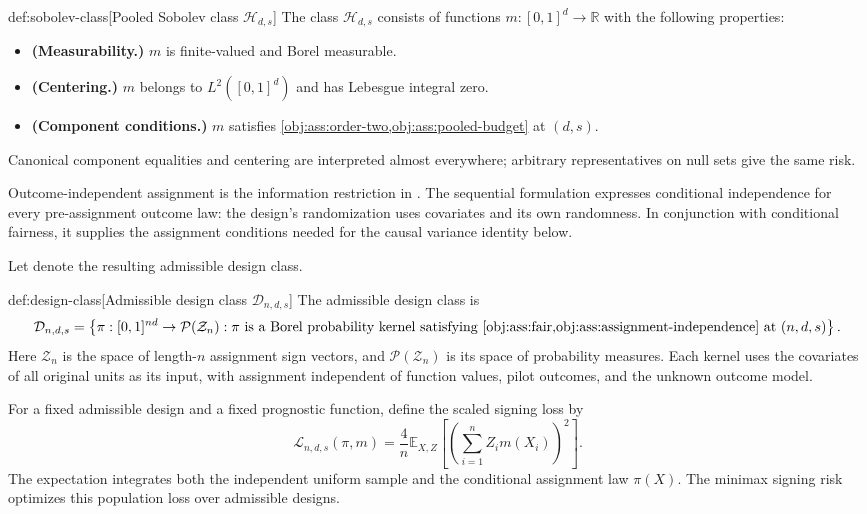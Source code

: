 \documentclass[11pt]{article}
\begin{document}
\begin{definitionv}{def:sobolev-class}[Pooled Sobolev class \(\mathcal H_{d,s}\)]
The class \(\mathcal H_{d,s}\) consists of functions \(m:[0,1]^d\to\mathbb R\) with the following properties:
\begin{itemize}
\item \textbf{(Measurability.)} \(m\) is finite-valued and Borel measurable.
\item \textbf{(Centering.)} \(m\) belongs to \(L^2([0,1]^d)\) and has Lebesgue integral zero.
\item \textbf{(Component conditions.)} \(m\) satisfies \cref{obj:ass:order-two,obj:ass:pooled-budget} at \((d,s)\).
\end{itemize}
Canonical component equalities and centering are interpreted almost everywhere; arbitrary representatives on null sets give the same risk.
\end{definitionv}

Outcome-independent assignment is the information restriction in \citep[Definition 2.2]{Cytrynbaum2026Limits}. The sequential formulation expresses conditional independence for every pre-assignment outcome law: the design's randomization uses covariates and its own randomness. In conjunction with conditional fairness, it supplies the assignment conditions needed for the causal variance identity below.

Let  denote the resulting admissible design class.

\begin{definitionv}{def:design-class}[Admissible design class $\mathcal D_{n,d,s}$]
The admissible design class is
\[
\mathcal D_{n,d,s}
=
\left\{
\pi:[0,1]^{nd}\to\mathcal P(\mathcal Z_n):
\pi \text{ is a Borel probability kernel satisfying }
\cref{obj:ass:fair,obj:ass:assignment-independence}
\text{ at }(n,d,s)
\right\}.
\]
Here \(\mathcal Z_n\) is the space of length-\(n\) assignment sign vectors, and \(\mathcal P(\mathcal Z_n)\) is its space of probability measures. Each kernel uses the covariates of all original units as its input, with assignment independent of function values, pilot outcomes, and the unknown outcome model.
\end{definitionv}

For a fixed admissible design and a fixed prognostic function, define the scaled signing loss  by
\[
\mathcal L_{n,d,s}(\pi,m)
=
\frac4n
\mathbb E_{X,Z}
\left[
\left(\sum_{i=1}^n Z_i m(X_i)\right)^2
\right].
\]
The expectation integrates both the independent uniform sample and the conditional assignment law \(\pi(X)\). The minimax signing risk  optimizes this population loss over admissible designs.
\end{document}
